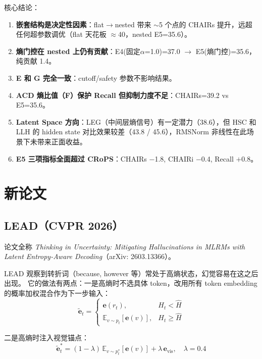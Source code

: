 \documentclass[12pt,a4paper]{ctexart}
\begin{document}
核心结论：
\begin{enumerate}[leftmargin=2em]
\item \textbf{嵌套结构是决定性因素}：flat$\to$nested 带来 $\sim$5 个点的 CHAIRs 提升，远超任何超参数调优（flat 天花板 $\approx$40，nested E5=35.6）。
\item \textbf{熵门控在 nested 上仍有贡献}：E4(固定$\alpha$=1.0)=37.0 $\to$ E5(熵门控)=35.6，纯贡献 1.4。
\item \textbf{E 和 G 完全一致}：cutoff/safety 参数不影响结果。
\item \textbf{ACD 熵比值（F）保护 Recall 但抑制力度不足}：CHAIRs=39.2 vs E5=35.6。
\item \textbf{Latent Space 方向}：LEG（中间层熵信号）有一定潜力（38.6），但 HSC 和 LLH 的 hidden state 对比效果较差（43.8 / 45.6），RMSNorm 非线性在此场景下未带来正面收益。
\item \textbf{E5 三项指标全面超过 CRoPS}：CHAIRs $-$1.8, CHAIRi $-$0.4, Recall $+$0.8。
\end{enumerate}

\section{新论文}

\subsection{LEAD（CVPR 2026）}

论文全称 \textit{Thinking in Uncertainty: Mitigating Hallucinations in MLRMs with Latent Entropy-Aware Decoding}（arXiv: 2603.13366）。

LEAD 观察到转折词（because, however 等）常处于高熵状态，幻觉容易在这之后出现。
它的做法有两点：一是高熵时不选具体 token，改用所有 token embedding 的概率加权混合作为下一步输入：
\begin{equation}
\tilde{\mathbf{e}}_t = \begin{cases}
\mathbf{e}(r_t), & H_t < \hat{H} \\
\mathbb{E}_{v \sim p_t}[\mathbf{e}(v)], & H_t \geq \hat{H}
\end{cases}
\end{equation}

二是高熵时注入视觉锚点：
\begin{equation}
\tilde{\mathbf{e}}_t^* = (1-\lambda)\,\mathbb{E}_{v \sim p_t^*}[\mathbf{e}(v)] + \lambda\,\mathbf{e}_{\text{vis}}, \quad \lambda = 0.4
\end{equation}
\end{document}
